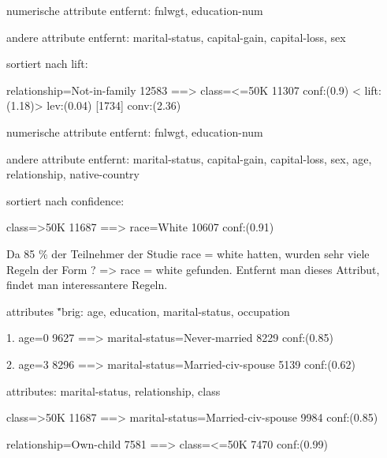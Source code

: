 
numerische attribute entfernt: fnlwgt, education-num

andere attribute entfernt: marital-status, capital-gain, capital-loss, sex

sortiert nach lift: 

relationship=Not-in-family 12583 ==> class=<=50K 11307    conf:(0.9) < lift:(1.18)> lev:(0.04) [1734] conv:(2.36)



numerische attribute entfernt: fnlwgt, education-num

andere attribute entfernt: marital-status, capital-gain, capital-loss, sex, age, relationship, native-country

sortiert nach confidence:

class=>50K 11687 ==> race=White 10607    conf:(0.91)

Da 85 \% der Teilnehmer der Studie race = white hatten, wurden sehr viele Regeln der Form ? => race = white gefunden. Entfernt man dieses Attribut, findet man interessantere Regeln.


attributes \u"brig: age, education, marital-status, occupation

1. age=0 9627 ==> marital-status=Never-married 8229    conf:(0.85)

2. age=3 8296 ==> marital-status=Married-civ-spouse 5139    conf:(0.62)


attributes: marital-status, relationship, class

class=>50K 11687 ==> marital-status=Married-civ-spouse 9984    conf:(0.85)

relationship=Own-child 7581 ==> class=<=50K 7470    conf:(0.99)




